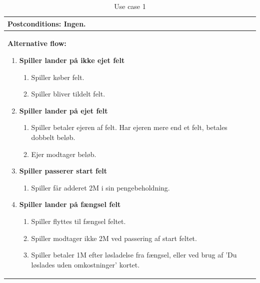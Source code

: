             \begin{table}[H]
                \begin{center}
                    \begin{tabular}{ | p{15cm} |}
                        \hline
            \textbf{Postconditions:} Ingen.\\ \hline
            \textbf{Alternative flow:}
            \begin{enumerate}
                \item \textbf{Spiller lander på ikke ejet felt}
                \begin{enumerate}
                    \item {Spiller køber felt.}
                    \item {Spiller bliver tildelt felt.}
                \end{enumerate}
                \item \textbf{Spiller lander på ejet felt}
                \begin{enumerate}
                    \item {Spiller betaler ejeren af felt. Har ejeren mere end et felt, betales dobbelt beløb.}
                    \item {Ejer modtager beløb.}                    
                \end{enumerate}
                \item \textbf{Spiller passerer start felt}
                \begin{enumerate}
                    \item {Spiller får adderet 2M i sin pengebeholdning.}
                \end{enumerate}
                \item \textbf{Spiller lander på fængsel felt}
                \begin{enumerate}
                    \item {Spiller flyttes til fængsel feltet.}
                    \item {Spiller modtager ikke 2M ved passering af start feltet.}
                    \item {Spiller betaler 1M efter løsladelse fra fængsel, eller ved brug af 'Du løslades uden omkostninger' kortet.}
                \end{enumerate}
            \end{enumerate} \\ \hline
            \hline
        \end{tabular}
        \caption{Use case 1}
        \label{usecase:1}
    \end{center}
\end{table}

